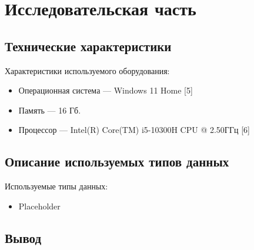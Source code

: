 \chapter{Исследовательская часть}

\section{Технические характеристики}
Характеристики используемого оборудования:
\begin{itemize}
    \item Операционная система --- Windows 11 Home [5]
    \item Память --- 16 Гб.
    \item Процессор --- Intel(R) Core(TM) i5-10300H CPU @ 2.50ГГц [6]
\end{itemize}

\section{Описание используемых типов данных}
Используемые типы данных:
\begin{itemize}
	\item Placeholder
\end{itemize}

\section{Вывод}
